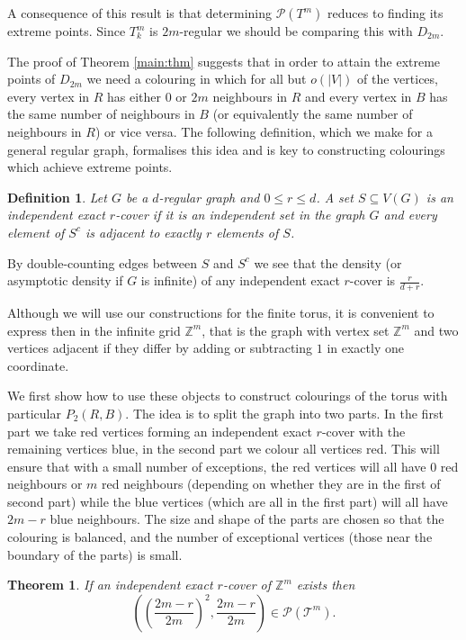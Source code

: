\documentclass[12pt,a4paper]{article}
\newcommand{\Z}{\mathbb Z}
\newcommand{\T}{\mathcal T}
\newcommand{\Pcal}{\mathcal P}
\newtheorem{thm}{Theorem}
\newtheorem*{defn}{Definition}
\begin{document}
A consequence of this result is that determining $\Pcal(T^m)$ reduces to finding its extreme points. Since $T^m_k$ is $2m$-regular we should be comparing this with $D_{2m}$.

The proof of Theorem \ref{main:thm} suggests that in order to attain the extreme points of $D_{2m}$ we need a colouring in which for all but $o(|V|)$ of the vertices, every vertex in $R$ has either $0$ or $2m$ neighbours in $R$ and every vertex in $B$ has the same number of neighbours in $B$ (or equivalently the same number of neighbours in $R$) or vice versa. The following definition, which we make for a general regular graph, formalises this idea and is key to constructing colourings which achieve extreme points. 

\begin{defn} 
Let $G$ be a $d$-regular graph and $0\leq r\leq d$. A set $S\subseteq V(G)$ is an \emph{independent exact $r$-cover} if it is an independent set in the graph $G$ and every element of $S^c$ is adjacent to exactly $r$ elements of $S$.
\end{defn}

By double-counting edges between $S$ and $S^c$ we see that the density (or asymptotic density if $G$ is infinite) of any independent exact $r$-cover is $\frac{r}{d+r}$.

Although we will use our constructions for the finite torus, it is convenient to express then in the infinite grid $\Z^m$, that is the graph with vertex set $\Z^m$ and two vertices adjacent if they differ by adding or subtracting $1$ in exactly one coordinate.

We first show how to use these objects to construct colourings of the torus with particular $P_2(R,B)$. The idea is to split the graph into two parts. In the first part we take red vertices forming an independent exact $r$-cover with the remaining vertices blue, in the second part we colour all vertices red. This will ensure that with a small number of exceptions, the red vertices will all have $0$ red neighbours or $m$ red neighbours (depending on whether they are in the first of second part) while the blue vertices (which are all in the first part) will all have $2m-r$ blue neighbours. The size and shape of the parts are chosen so that the colouring is balanced, and the number of exceptional vertices (those near the boundary of the parts) is small.

\begin{thm}\label{cover}
If an independent exact $r$-cover of $\Z^m$ exists then 
\[
\left(\left(\frac{2m-r}{2m}\right)^2,\frac{2m-r}{2m}\right)\in \Pcal(\T^m).
\]
\end{thm}
\end{document}
